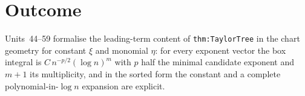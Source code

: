 \documentclass[11pt]{article}
\begin{document}
\section{Outcome}
Units~44--59 formalise the leading-term content of \texttt{thm:TaylorTree} in the chart geometry for
constant $\xi$ and monomial $\eta$: for every exponent vector the box integral is
$C\,n^{-p/2}(\log n)^m$ with $p$ half the minimal candidate exponent and $m+1$ its multiplicity, and
in the sorted form the constant and a complete polynomial-in-$\log n$ expansion are explicit.
\end{document}
